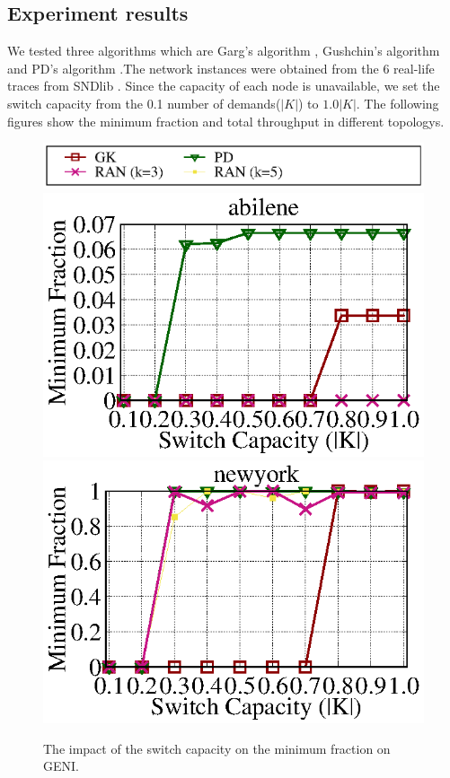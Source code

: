 \documentclass[a4paper,12pt]{report}
\begin{document}
\begin{CJK*}{UTF8}{bkai}
\begin{large}
  \chapter{Experiment results}
  \qquad We tested three algorithms which are Garg’s algorithm \cite{grag}, Gushchin’s algorithm \cite{gk} and PD's algorithm \cite{our}.The network instances were obtained from the 6 real-life traces from SNDlib \cite{SNDlib}. Since the capacity of each node is unavailable, we set the switch capacity from the 0.1 number of demands($|K|$) to $1.0|K|$. The following figures show the  minimum fraction and total throughput in different topologys.
  \begin{figure}[ht]
    \caption{The impact of the switch capacity on the minimum fraction on GENI.}
	\centering
	  \includegraphics[width=1.0\textwidth]{lambda_legend.eps}
	  \includegraphics[width=1.0\textwidth]{abilene_geni_lambda_e05.eps}
	  \includegraphics[width=1.0\textwidth]{newyork_geni_lambda_e05.eps}

\end{figure}
\end{large}
\end{CJK*}
\end{document}
